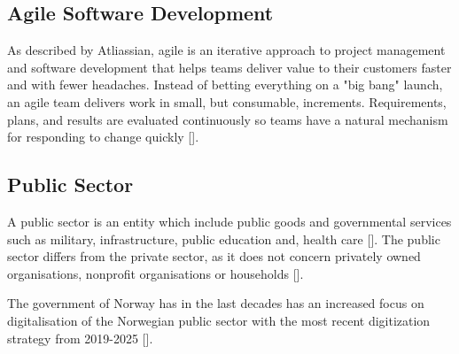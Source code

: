 \subsection{Agile Software Development}
As described by Atliassian, agile is an iterative approach to project management and software development that helps teams deliver value to their customers faster and with fewer headaches. Instead of betting everything on a "big bang" launch, an agile team delivers work in small, but consumable, increments. Requirements, plans, and results are evaluated continuously so teams have a natural mechanism for responding to change quickly [\cite{a_2022}]. 

\subsection{Public Sector}
A public sector is an entity which include public goods and governmental services such as military, infrastructure, public education and, health care [\cite{ps_2022}]. The public sector differs from the private sector, as it does not concern privately owned organisations, nonprofit organisations or households [\cite{os_2022}]. 

The government of Norway has in the last decades has an increased focus on digitalisation of the Norwegian public sector with the most recent digitization strategy from 2019-2025 [\cite{r_2019}]. 